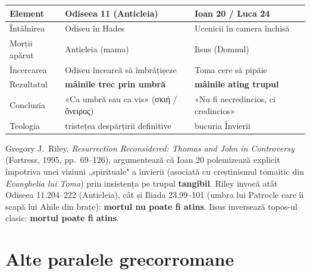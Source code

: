 \documentclass[12pt,a4paper,twoside,openany]{book}
\begin{document}
\begin{center}
\small
\begin{tabularx}{\textwidth}{L{3cm}L{5cm}X}
\toprule
{}
\textbf{Element} & \textbf{Odiseea 11} (Anticleia) & \textbf{Ioan 20 / Luca 24} \\
\midrule
Întâlnirea & Odiseu în Hades & Ucenicii în camera închisă \\
Morții apărut & Anticleia (mama) & Iisus (Domnul) \\
Încercarea & Odiseu încearcă să îmbrățișeze & Toma cere să pipăie \\
Rezultatul & \textbf{mâinile trec prin umbră} & \textbf{mâinile ating trupul} \\
Concluzia & «Ca umbră sau ca vis» (σκιή / ὄνειρος) & «Nu fi necredincios, ci credincios» \\
Teologia & tristețea despărțirii definitive & bucuria Învierii \\
\bottomrule
\end{tabularx}
\end{center}

Gregory J.~Riley, \textit{Resurrection Reconsidered: Thomas and John in Controversy} (Fortress, 1995, pp.~69--126), argumentează că Ioan 20 polemizează explicit împotriva unei viziuni „spirituale" a învierii (asociată cu creștinismul tomaitic din \textit{Evanghelia lui Toma}) prin insistența pe trupul \textbf{tangibil}. Riley invocă atât Odiseea 11.204--222 (Anticleia), cât și Iliada 23.99--101 (umbra lui Patrocle care îi scapă lui Ahile din brațe): \textbf{mortul nu poate fi atins}. Iisus inversează topos-ul clasic: \textbf{mortul poate fi atins}.

\section{Alte paralele grecorromane}
\end{document}
